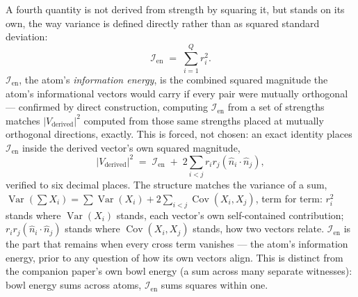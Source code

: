 \documentclass[12pt, a4paper]{article}
\begin{document}
A fourth quantity is not derived from strength by squaring it, but
stands on its own, the way variance is defined directly rather than
as squared standard deviation:
\begin{equation}
    \mathcal{I}_{\mathrm{en}} \;=\; \sum_{i=1}^Q r_i^2.
    \label{eq:information_energy}
\end{equation}
$\mathcal{I}_{\mathrm{en}}$, the atom's \emph{information energy}, is the combined squared magnitude the
atom's informational vectors would carry if every pair were mutually
orthogonal --- confirmed by direct construction, computing
$\mathcal{I}_{\mathrm{en}}$ from a set of strengths matches $\lvert
V_{\text{derived}}\rvert^2$ computed from those same strengths placed
at mutually orthogonal directions, exactly. This is forced, not
chosen: an exact identity places $\mathcal{I}_{\mathrm{en}}$ inside
the derived vector's own squared magnitude,
\[
\lvert V_{\text{derived}}\rvert^2 \;=\; \mathcal{I}_{\mathrm{en}}
\;+\; 2\sum_{i<j} r_ir_j(\hat n_i\cdot\hat n_j),
\]
verified to six decimal places. The structure matches the variance
of a sum, $\operatorname{Var}(\sum X_i) = \sum\operatorname{Var}(X_i)
+ 2\sum_{i<j}\operatorname{Cov}(X_i,X_j)$, term for term: $r_i^2$
stands where $\operatorname{Var}(X_i)$ stands, each vector's own
self-contained contribution; $r_ir_j(\hat n_i\cdot\hat n_j)$ stands
where $\operatorname{Cov}(X_i,X_j)$ stands, how two vectors relate.
$\mathcal{I}_{\mathrm{en}}$ is the part that remains when every cross
term vanishes --- the atom's information energy, prior to any question
of how its own vectors align. This is distinct from the companion
paper's own bowl energy (a sum across many separate witnesses):
bowl energy sums across atoms, $\mathcal{I}_{\mathrm{en}}$ sums
squares within one.
\end{document}
